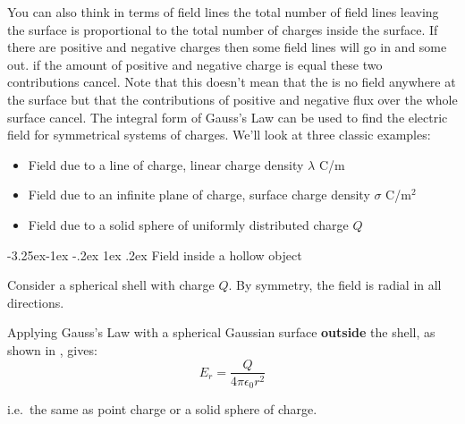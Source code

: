 \documentclass[
]{book}
\makeatletter
\renewcommand\subsection{%
\@startsection{subsection}{2}{\z@}%
              {-3.25ex\@plus -1ex \@minus -.2ex}%
              {1ex \@plus .2ex}%
              {\sffamily\bfseries}}
\makeatother
\begin{document}
You can also think in terms of field lines the total number of field
lines leaving the surface is proportional to the total number of charges
inside the surface. If there are positive and negative charges then some
field lines will go in and some out. if the amount of positive and
negative charge is equal these two contributions cancel. Note that this
doesn't mean that the is no field anywhere at the surface but that the
contributions of positive and negative flux over the whole surface
cancel. The integral form of Gauss's Law can be used to find the
electric field for symmetrical systems of charges. We'll look at three
classic examples:

\begin{itemize}
\item
  Field due to a line of charge, linear charge density \(\lambda\) C/m
\item
  Field due to an infinite plane of charge, surface charge density
  \(\sigma\) C/m\(^2\)
\item
  Field due to a solid sphere of uniformly distributed charge \(Q\)
\end{itemize}

\hypertarget{field-inside-a-hollow-object}{%
\subsection{Field inside a hollow object}\label{field-inside-a-hollow-object}}

Consider a spherical shell with charge \(Q\). By symmetry, the field is
radial in all directions.

Applying Gauss's Law with a spherical Gaussian surface \textbf{outside} the
shell, as shown in , gives:
\begin{equation}
\label{eq:fieldShell}
E_r = \frac{Q}{4\pi\epsilon_0 r^2} 
\end{equation}

i.e.~the same as point charge or a solid sphere of charge.
\end{document}
